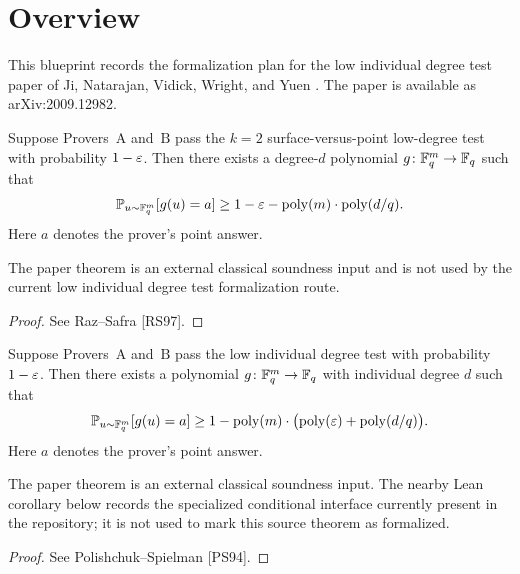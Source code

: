 \chapter{Overview}
\label{chap:overview}

This blueprint records the formalization plan for the low individual degree
test paper of Ji, Natarajan, Vidick, Wright, and Yuen
\cite{Ji2020LowIndividualDegree}.  The paper is available as
arXiv:2009.12982.

\begin{theorem}\label{thm:raz-safra}
	Suppose Provers~$\mathrm{A}$ and~$\mathrm{B}$ pass the $k=2$ surface-versus-point low-degree test with probability $1-\varepsilon$. Then there exists a degree-$d$ polynomial $g \colon \mathbb{F}_q^m \to \mathbb{F}_q$ such that
	\[
		\mathbb{P}_{u \sim \mathbb{F}_q^m}[g(u)=a] \ge 1-\varepsilon-\operatorname{poly}(m)\cdot\operatorname{poly}(d/q).
	\]
	Here $a$ denotes the prover's point answer.
\end{theorem}
\begin{remark}
	The paper theorem is an external classical soundness input and is not used by
	the current low individual degree test formalization route.
\end{remark}
\begin{proof}
	See Raz--Safra [RS97].
\end{proof}

\begin{theorem}\label{thm:classical-test-soundness}
	Suppose Provers~$\mathrm{A}$ and~$\mathrm{B}$ pass the low individual degree test with probability $1-\varepsilon$. Then there exists a polynomial $g \colon \mathbb{F}_q^m \to \mathbb{F}_q$ with individual degree $d$ such that
	\[
		\mathbb{P}_{u \sim \mathbb{F}_q^m}[g(u)=a] \ge 1-\operatorname{poly}(m)\cdot\bigl(\operatorname{poly}(\varepsilon)+\operatorname{poly}(d/q)\bigr).
	\]
	Here $a$ denotes the prover's point answer.
\end{theorem}
\begin{remark}
	The paper theorem is an external classical soundness input.  The nearby Lean
	corollary below records the specialized conditional interface currently present
	in the repository; it is not used to mark this source theorem as formalized.
\end{remark}
\begin{proof}
	See Polishchuk--Spielman [PS94].
\end{proof}

